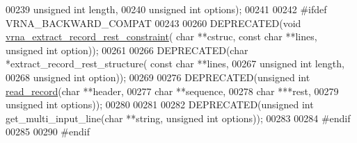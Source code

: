 \begin{DoxyCode}
00239                                           \textcolor{keywordtype}{unsigned} \textcolor{keywordtype}{int} length,
00240                                           \textcolor{keywordtype}{unsigned} \textcolor{keywordtype}{int} options);
00241 
00242 \textcolor{preprocessor}{#ifdef  VRNA\_BACKWARD\_COMPAT}
00243 
00260 DEPRECATED(\textcolor{keywordtype}{void} \hyperlink{group__file__utils_ga55a9ae6dfeecc1b3f0c2acf6fa796c15}{vrna\_extract\_record\_rest\_constraint}( \textcolor{keywordtype}{char} **cstruc, \textcolor{keyword}{
      const} \textcolor{keywordtype}{char} **lines, \textcolor{keywordtype}{unsigned} \textcolor{keywordtype}{int} option));
00261 
00266 DEPRECATED(\textcolor{keywordtype}{char} *extract\_record\_rest\_structure( \textcolor{keyword}{const} \textcolor{keywordtype}{char} **lines,
00267                                                 \textcolor{keywordtype}{unsigned} \textcolor{keywordtype}{int} length,
00268                                                 \textcolor{keywordtype}{unsigned} \textcolor{keywordtype}{int} option));
00269 
00276 DEPRECATED(\textcolor{keywordtype}{unsigned} \textcolor{keywordtype}{int} \hyperlink{group__file__utils_gafd194a69af9d92b5b0412a7627ac1595}{read\_record}(\textcolor{keywordtype}{char} **header,
00277                                     \textcolor{keywordtype}{char} **sequence,
00278                                     \textcolor{keywordtype}{char}  ***rest,
00279                                     \textcolor{keywordtype}{unsigned} \textcolor{keywordtype}{int} options));
00280 
00281 
00282 DEPRECATED(\textcolor{keywordtype}{unsigned} \textcolor{keywordtype}{int} get\_multi\_input\_line(\textcolor{keywordtype}{char} **\textcolor{keywordtype}{string}, \textcolor{keywordtype}{unsigned} \textcolor{keywordtype}{int} options));
00283 
00284 \textcolor{preprocessor}{#endif}
00285 
00290 \textcolor{preprocessor}{#endif}
\end{DoxyCode}
